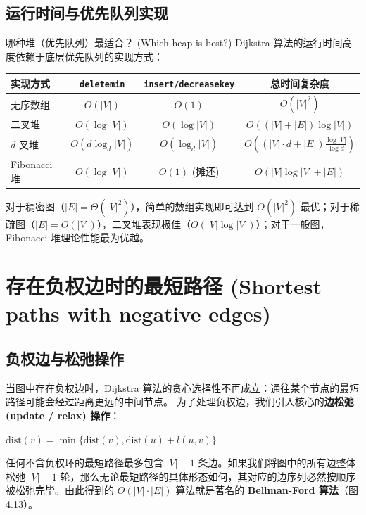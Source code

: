 \subsection{运行时间与优先队列实现}

\begin{sidebarbox}{哪种堆（优先队列）最适合？ (Which heap is best?)}
Dijkstra 算法的运行时间高度依赖于底层优先队列的实现方式：
\begin{center}
\begin{tabular}{lccc}
\hline
实现方式 & \texttt{deletemin} & \texttt{insert/decreasekey} & 总时间复杂度 \\
\hline
无序数组 & $O(|V|)$ & $O(1)$ & $O(|V|^2)$ \\
二叉堆 & $O(\log |V|)$ & $O(\log |V|)$ & $O((|V| + |E|) \log |V|)$ \\
$d$ 叉堆 & $O(d \log_d |V|)$ & $O(\log_d |V|)$ & $O((|V| \cdot d + |E|) \frac{\log |V|}{\log d})$ \\
Fibonacci 堆 & $O(\log |V|)$ & $O(1)$ (摊还) & $O(|V| \log |V| + |E|)$ \\
\hline
\end{tabular}
\end{center}
对于稠密图（$|E| = \Theta(|V|^2)$），简单的数组实现即可达到 $O(|V|^2)$ 最优；对于稀疏图（$|E| = O(|V|)$），二叉堆表现极佳（$O(|V| \log |V|)$）；对于一般图，Fibonacci 堆理论性能最为优越。
\end{sidebarbox}

\section{存在负权边时的最短路径 (Shortest paths with negative edges)}

\subsection{负权边与松弛操作}
当图中存在负权边时，Dijkstra 算法的贪心选择性不再成立：通往某个节点的最短路径可能会经过距离更远的中间节点。
为了处理负权边，我们引入核心的\textbf{边松弛 (update / relax) 操作}：
\begin{algorithmic}[1]
    \State $\text{dist}(v) = \min\{\text{dist}(v), \text{dist}(u) + l(u, v)\}$
\EndProcedure
\end{algorithmic}

任何不含负权环的最短路径最多包含 $|V| - 1$ 条边。如果我们将图中的所有边整体松弛 $|V| - 1$ 轮，那么无论最短路径的具体形态如何，其对应的边序列必然按顺序被松弛完毕。由此得到的 $O(|V| \cdot |E|)$ 算法就是著名的 \textbf{Bellman-Ford 算法}（图 4.13）。

